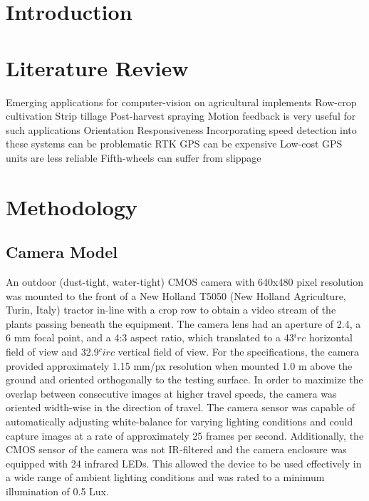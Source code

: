 \begin{abstract}
\lipsum[1]
\end{abstract}

\section{Introduction}
\lipsum[1]

\section{Literature Review}
Emerging applications for computer-vision on agricultural implements
Row-crop cultivation
Strip tillage
Post-harvest spraying
Motion feedback is very useful for such applications
Orientation
Responsiveness
Incorporating speed detection into these systems can be problematic
RTK GPS can be expensive
Low-cost GPS units are less reliable
Fifth-wheels can suffer from slippage

\section{Methodology}

\subsection{Camera Model}
An outdoor (dust-tight, water-tight) CMOS camera with 640x480 pixel
resolution was mounted to the front of a New Holland T5050 (New
Holland Agriculture, Turin, Italy) tractor in-line with a crop row to
obtain a video stream of the plants passing beneath the equipment. The
camera lens had an aperture of 2.4, a 6 mm focal point, and a 4:3
aspect ratio, which translated to a 43$^irc{}$ horizontal field of view and
32.9$^circ{}$ vertical field of view. For the specifications, the camera
provided approximately 1.15 mm/px resolution when mounted 1.0 m above
the ground and oriented orthogonally to the testing surface. In order
to maximize the overlap between consecutive images at higher travel
speeds, the camera was oriented width-wise in the direction of
travel. The camera sensor was capable of automatically adjusting
white-balance for varying lighting conditions and could capture images
at a rate of approximately 25 frames per second. Additionally, the
CMOS sensor of the camera was not IR-filtered and the camera enclosure
was equipped with 24 infrared LEDs. This allowed the device to be used
effectively in a wide range of ambient lighting conditions and was
rated to a minimum illumination of 0.5 Lux.

